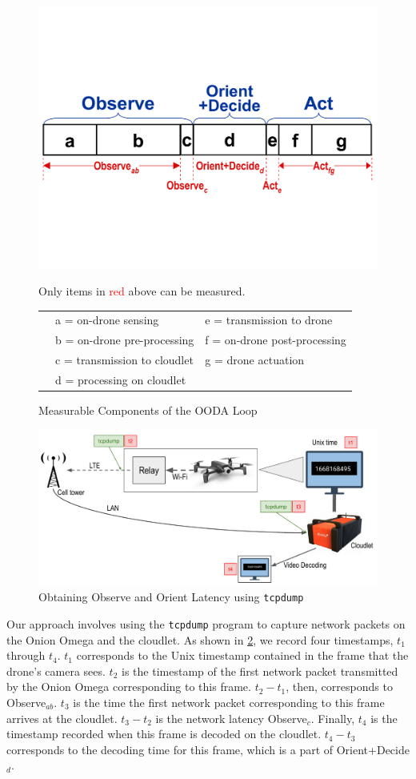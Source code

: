 \begin{figure}[htbp]
    \centering
\includegraphics[width = .5\textwidth]{figs/fig-ooda-nomenclature.pdf}
	\begin{captext}
		\centering Only items in \textcolor{red}{red} above can be measured.
		\begin{tabular}{lll}
			\phantom{00} & a = on-drone sensing & e = transmission to drone\\
			\phantom{00} & b = on-drone pre-processing & f = on-drone post-processing\\
			\phantom{00} & c = transmission to cloudlet & g = drone actuation\\
			\phantom{00} & d = processing on cloudlet\\
		\end{tabular}
	\end{captext}
\caption{Measurable Components of the OODA Loop}
\label{fig:ooda-nomenclature}
\end{figure}

\begin{figure}[htbp]
    \centerline{\includegraphics[width = .8\textwidth]{figs/fig-exp2-method-crop.pdf}}
    \caption{Obtaining Observe and Orient Latency using \texttt{tcpdump}}
\label{fig:exp2-method}
\end{figure}

Our approach involves using the \texttt{tcpdump} program to capture network
packets on the Onion Omega and the cloudlet. As shown in
\cref{fig:exp2-method}, we record four timestamps, $t_1$ through $t_4$. $t_1$
corresponds to the Unix timestamp contained in the frame that the drone's
camera sees. $t_2$ is the timestamp of the first network packet transmitted by
the Onion Omega corresponding to this frame. $t_2-t_1$, then, corresponds to
Observe$_{ab}$.  $t_3$ is the time the first network packet corresponding to
this frame arrives at the cloudlet. $t_3-t_2$ is the network latency
Observe$_c$. Finally, $t_4$ is the timestamp recorded when this frame is
decoded on the cloudlet.  $t_4-t_3$ corresponds to the decoding time for this
frame, which is a part of Orient+Decide$_d$.

